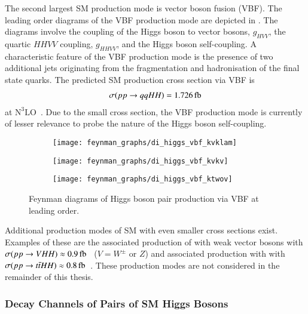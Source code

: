 The second largest SM \HH production mode is vector boson fusion (VBF). The
leading order diagrams of the VBF production mode are depicted in
. The diagrams involve the coupling of the Higgs
boson to vector bosons, $g_{HVV}$, the quartic $HHVV$ coupling, $g_{HHVV}$, and
the Higgs boson self-coupling. A characteristic feature of the VBF production
mode is the presence of two additional jets originating from the fragmentation
and hadronisation of the final state quarks. The predicted SM \HH production
cross section via VBF is
\begin{align*}
  \sigma(\pp \to qqHH) = \SI{1.726}{\femto\barn}
\end{align*}
at $\text{N}^3\text{LO}$~\cite{Dreyer:2018qbw,LHCHWGHH}. Due to the small cross
section, the VBF production mode is currently of lesser relevance to probe the
nature of the Higgs boson self-coupling.

\begin{figure}[htbp]
  \centering

  \begin{subfigure}{0.33\textwidth}
    \centering
    \texttt{[image: feynman\_graphs/di\_higgs\_vbf\_kvklam]}
    \subcaption{}
  \end{subfigure}\hfill%
  \begin{subfigure}{0.33\textwidth}
    \centering
    \texttt{[image: feynman\_graphs/di\_higgs\_vbf\_kvkv]}
    \subcaption{}
  \end{subfigure}\hfill%
  \begin{subfigure}{0.33\textwidth}
    \centering
    \texttt{[image: feynman\_graphs/di\_higgs\_vbf\_ktwov]}
    \subcaption{}
  \end{subfigure}

  \caption{Feynman diagrams of Higgs boson pair production via VBF at leading
    order.}%
  \label{fig:dihiggs_vbf_feyn}
\end{figure}

Additional production modes of SM \HH with even smaller cross sections
exist. Examples of these are the associated production of \HH with weak vector
bosons with
$\sigma(\pp \to VHH) \approx \SI{0.9}{\femto\barn}$~\cite{deFlorian:2016spz}
($V = W^\pm$ or $Z$) and associated production with \ttbar with
$\sigma(\pp \to \ttbar HH) \approx
\SI{0.8}{\femto\barn}$~\cite{deFlorian:2016spz}. These production modes are not
considered in the remainder of this thesis.


\subsubsection{Decay Channels of Pairs of SM Higgs Bosons}%

